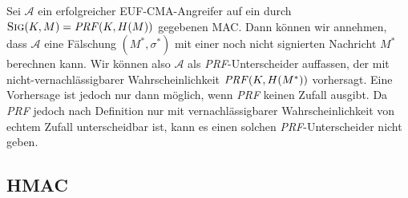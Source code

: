 \begin{beweis}[Entwurf]
Sei $\mathcal{A}$ ein erfolgreicher EUF-CMA-Angreifer auf ein durch $\textsc{Sig}(K,M) = \text{\textit{PRF}}(K,H(M))$ gegebenen MAC. Dann können wir annehmen,
dass $\mathcal{A}$ eine Fälschung $(M^*,\sigma^*)$ mit einer noch nicht signierten Nachricht $M^*$ berechnen kann. Wir können also $\mathcal{A}$ als
\textit{PRF}-Unterscheider auffassen, der mit nicht-vernachlässigbarer Wahrscheinlichkeit $\text{\textit{PRF}}(K,H(M^*))$ vorhersagt. Eine Vorhersage ist jedoch
nur dann möglich, wenn \textit{PRF} keinen Zufall ausgibt. Da \textit{PRF} jedoch nach Definition nur mit vernachlässigbarer Wahrscheinlichkeit von echtem
Zufall unterscheidbar ist, kann es einen solchen \textit{PRF}-Unterscheider nicht geben.
\end{beweis}

\subsection{HMAC}


